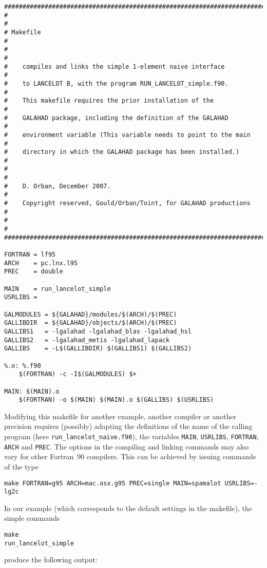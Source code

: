 \documentclass{article}
\begin{document}
\begin{lstlisting}[style=cshstyle]
########################################################################
#                                                                      #
# Makefile                                                             #
#                                                                      #
#    compiles and links the simple 1-element naive interface           #
#    to LANCELOT B, with the program RUN_LANCELOT_simple.f90.          #
#    This makefile requires the prior installation of the              #
#    GALAHAD package, including the definition of the GALAHAD          #
#    environment variable (This variable needs to point to the main    #
#    directory in which the GALAHAD package has been installed.)       #
#                                                                      #
#    D. Orban, December 2007.                                          #
#    Copyright reserved, Gould/Orban/Toint, for GALAHAD productions    #
#                                                                      #
########################################################################

FORTRAN = lf95
ARCH    = pc.lnx.l95
PREC    = double

MAIN    = run_lancelot_simple
USRLIBS =

GALMODULES = ${GALAHAD}/modules/$(ARCH)/$(PREC)
GALLIBDIR  = ${GALAHAD}/objects/$(ARCH)/$(PREC)
GALLIBS1   = -lgalahad -lgalahad_blas -lgalahad_hsl
GALLIBS2   = -lgalahad_metis -lgalahad_lapack
GALLIBS    = -L$(GALLIBDIR) $(GALLIBS1) $(GALLIBS2)

%.o: %.f90
	$(FORTRAN) -c -I$(GALMODULES) $+

MAIN: $(MAIN).o
	$(FORTRAN) -o $(MAIN) $(MAIN).o $(GALLIBS) $(USRLIBS)
\end{lstlisting}

\noindent
Modifying this makefile for another example, another compiler or another
precision requires (possibly) adapting the definitions of the name of the
calling program (here {\tt run\_lancelot\_naive.f90}), the variables 
{\tt MAIN}, {\tt USRLIBS}, {\tt FORTRAN}, {\tt ARCH} and {\tt PREC}.
The options in the compiling and linking commands may also vary for other
Fortran~90 compilers. This can be achieved by issuing commands of the type
\begin{lstlisting}
make FORTRAN=g95 ARCH=mac.osx.g95 PREC=single MAIN=spamalot USRLIBS=-lg2c
\end{lstlisting}
In our example (which corresponds to the default settings in the makefile),
the simple commands
\begin{lstlisting}
make
run_lancelot_simple 
\end{lstlisting}
produce the following output:
\end{document}

